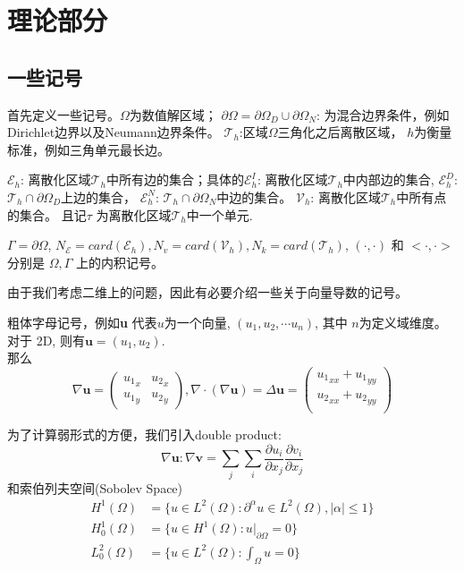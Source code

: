 \cleardoublepage{}

\chapter{理论部分}

\section{一些记号}
首先定义一些记号。$\Omega$为数值解区域；
$\partial\Omega=\partial \Omega_D\cup\partial\Omega_N$: 为混合边界条件，例如Dirichlet边界以及Neumann边界条件。
$\mathscr{T}_h$:区域$\Omega$三角化之后离散区域， $h$为衡量标准，例如三角单元最长边。

$\mathscr{E}_h$:  离散化区域$\mathscr{T}_h$中所有边的集合；具体的$\mathscr{E}_h^I$: 离散化区域$\mathscr{T}_h$中内部边的集合, $\mathscr{E}_h^D$: $\mathscr{T}_h\cap\partial\Omega_D $上边的集合，
$\mathscr{E}_h^N$: $\mathscr{T}_h\cap\partial\Omega_N $中边的集合。 
$\mathscr{V}_h$: 离散化区域$\mathscr{T}_h$中所有点的集合。
且记$\tau$ 为离散化区域$\mathscr{T}_h$中一个单元. 

$\Gamma=\partial \Omega$, 
$N_{\mathscr{E}}=card(\mathscr{E}_h),N_v=card(\mathscr{V}_h),N_k=card(\mathscr{T}_h)$, 
$(\cdot,\cdot)$ 和 $<\cdot, \cdot>$ 分别是 $\Omega, \Gamma$ 上的内积记号。


由于我们考虑二维上的问题，因此有必要介绍一些关于向量导数的记号。

粗体字母记号，例如\textbf{u} 代表$u$为一个向量, $(u_1, u_2, \cdots u_n)$, 其中 $n$为定义域维度。 对于 2D, 则有$\textbf{u}=(u_1, u_2)$.\\
那么 $$\nabla \textbf{u}=\begin{pmatrix}
    {u_1}_x & {u_2}_x\\
    {u_1}_y & {u_2}_y
\end{pmatrix}, \nabla \cdot (\nabla \textbf{u})=\Delta \textbf{u}=\begin{pmatrix}
    {u_1}_{xx}+{u_1}_{yy}\\
    {u_2}_{xx}+{u_2}_{yy}\\
\end{pmatrix}$$

为了计算弱形式的方便，我们引入double product:
$$\nabla \textbf{u}:\nabla \textbf{v}=\sum_{j}\sum_{i}\frac{\partial u_i}{\partial x_j}\frac{\partial v_i}{\partial x_j}$$
和索伯列夫空间(Sobolev Space)
$$\begin{aligned}
    H^1(\Omega)&=\{u\in L^2(\Omega):\partial^\alpha u\in L^2(\Omega),|\alpha|\leq 1\}\\
    H^1_0(\Omega)&=\{u\in H^1(\Omega): u|_{\partial \Omega}=0\}\\
    L^2_0(\Omega)&=\{u\in L^2(\Omega): \int_\Omega u=0\}
\end{aligned}$$


